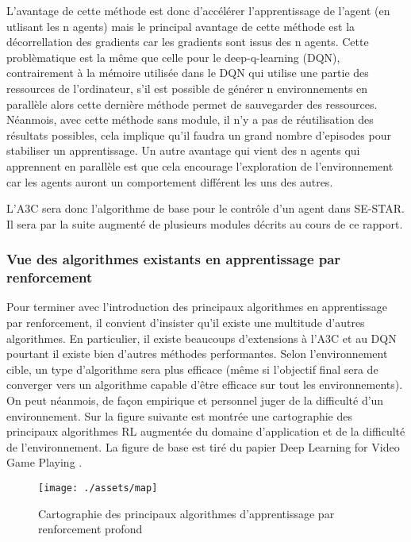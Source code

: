 L'avantage de cette méthode est donc d'accélérer l'apprentissage de l'agent (en utlisant les n agents) mais le principal avantage de cette méthode est la décorrellation des gradients car les gradients sont issus des n agents. Cette problèmatique est la même que celle pour le deep-q-learning (DQN), contrairement à la mémoire utilisée dans le DQN qui utilise une partie des ressources de l'ordinateur, s'il est possible de générer n environnements en parallèle alors cette dernière méthode permet de sauvegarder des ressources. Néanmois, avec cette méthode sans module, il n'y a pas de réutilisation des résultats possibles, cela implique qu'il faudra un grand nombre d'episodes pour stabiliser un apprentissage. Un autre avantage qui vient des n agents qui apprennent en parallèle est que cela encourage l'exploration de l'environnement car les agents auront un comportement différent les uns des autres. 

L'A3C sera donc l'algorithme de base pour le contrôle d'un agent dans SE-STAR. Il sera par la suite augmenté de plusieurs modules décrits au cours de ce rapport.
\subsubsection{Vue des algorithmes existants en apprentissage par renforcement}

Pour terminer avec l'introduction des principaux algorithmes en apprentissage par renforcement, il convient d'insister qu'il existe une multitude d'autres algorithmes. En particulier, il existe beaucoups d'extensions à l'\gls{A3C} et au DQN pourtant il existe bien d'autres méthodes performantes. Selon l'environnement cible, un type d'algorithme sera plus efficace (même si l'objectif final sera de converger vers un algorithme capable d'être efficace sur tout les environnements). On peut néanmois, de façon empirique et personnel juger de la difficulté d'un environnement. Sur la figure suivante est montrée une cartographie des principaux algorithmes \gls{RL} augmentée du domaine d'application et de la difficulté de l'environnement. La figure de base est tiré du papier Deep Learning for Video Game Playing \cite{2017arXiv170807902J}.

\begin{figure}[ht!]
    \begin{center}
        \texttt{[image: ./assets/map]}
    \end{center}
    \caption{Cartographie des principaux algorithmes d'apprentissage par renforcement profond}
\end{figure}
